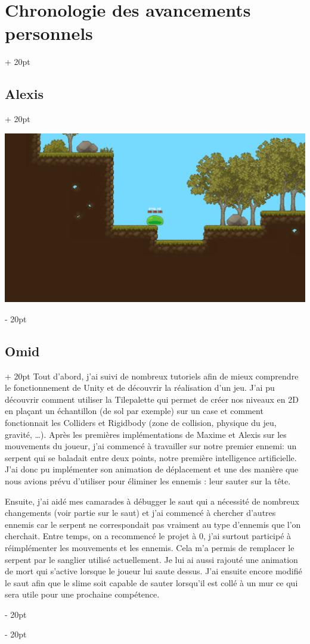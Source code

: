 \documentclass[a4paper, 12pt, twoside]{article}
\newcommand{\ind}[1][20pt]{\advance\leftskip + #1}
\newcommand{\deind}[1][20pt]{\advance\leftskip - #1}
\newenvironment{indt}[2][20pt]{#2 \par \ind[#1]}{\par \deind} %
\begin{document}
\begin{indt}{\section{Chronologie des avancements personnels}}
\begin{indt}{\subsection{Alexis}}
            \begin{center}
                \includegraphics[width=0.8\linewidth]{Lvl1.png}
            \end{center}
        \end{indt}

        \begin{indt}{\subsection{Omid}}
            Tout d'abord, j'ai suivi de nombreux tutoriels afin de mieux comprendre le fonctionnement de Unity et de découvrir la réalisation d'un jeu. J'ai pu découvrir comment utiliser la Tilepalette qui permet de créer nos niveaux en 2D en plaçant un échantillon (de sol par exemple) sur un case et comment fonctionnait les Colliders et Rigidbody (zone de collision, physique du jeu, gravité, …). Après les premières implémentations de Maxime et Alexis sur les mouvements du joueur, j'ai commencé à travailler sur notre premier ennemi: un serpent qui se baladait entre deux points, notre première intelligence artificielle. J'ai donc pu implémenter son animation de déplacement et une des manière que nous avions prévu d'utiliser pour éliminer les ennemis : leur sauter sur la tête. 

            Ensuite, j'ai aidé mes camarades à débugger le saut qui a nécessité de nombreux changements (voir partie sur le saut) et j'ai commencé à chercher d'autres ennemis car le serpent ne correspondait pas vraiment au type d'ennemis que l'on cherchait. Entre temps, on a recommencé le projet à 0, j'ai surtout participé à réimplémenter les mouvements et les ennemis. Cela m'a permis de remplacer le serpent par le sanglier utilisé actuellement. Je lui ai aussi rajouté une animation de mort qui s'active lorsque le joueur lui saute dessus. J'ai ensuite encore modifié le saut afin que le slime soit capable de sauter lorsqu'il est collé à un mur ce qui sera utile pour une prochaine compétence.


\end{indt}
\end{indt}
\end{document}
